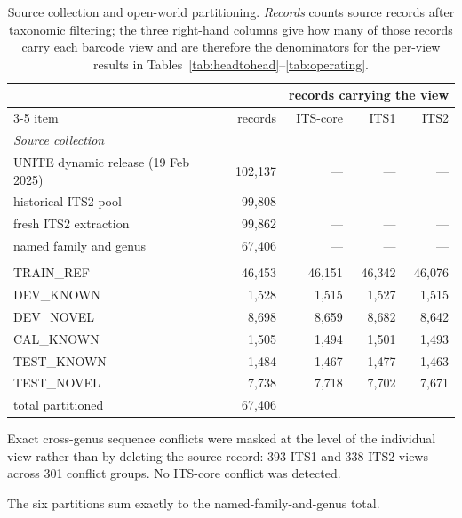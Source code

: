 \begin{table}[htbp]\centering
\begin{threeparttable}
\caption{Source collection and open-world partitioning. \emph{Records} counts source records after taxonomic filtering; the three right-hand columns give how many of those records carry each barcode view and are therefore the denominators for the per-view results in Tables~\ref{tab:headtohead}--\ref{tab:operating}.}
\label{tab:dataset}
\small
\setlength{\tabcolsep}{5pt}
\begin{tabular}{lrrrr}
\toprule
 & & \multicolumn{3}{c}{records carrying the view} \\
\cmidrule(l){3-5}
item & records & ITS-core & ITS1 & ITS2 \\
\midrule
\multicolumn{5}{l}{\emph{Source collection}} \\
\quad UNITE dynamic release (19 Feb 2025) & 102,137 & --- & --- & --- \\
\quad historical ITS2 pool & 99,808 & --- & --- & --- \\
\quad fresh ITS2 extraction & 99,862 & --- & --- & --- \\
\quad named family and genus & 67,406 & --- & --- & --- \\
\addlinespace
\multicolumn{5}{l}{\emph{Open-world partitions}} \\
\quad TRAIN\_REF & 46,453 & 46,151 & 46,342 & 46,076 \\
\quad DEV\_KNOWN & 1,528 & 1,515 & 1,527 & 1,515 \\
\quad DEV\_NOVEL & 8,698 & 8,659 & 8,682 & 8,642 \\
\quad CAL\_KNOWN & 1,505 & 1,494 & 1,501 & 1,493 \\
\quad TEST\_KNOWN & 1,484 & 1,467 & 1,477 & 1,463 \\
\quad TEST\_NOVEL & 7,738 & 7,718 & 7,702 & 7,671 \\
\addlinespace
\quad total partitioned & 67,406 & & & \\
\bottomrule
\end{tabular}
\begin{tablenotes}\footnotesize
\item Exact cross-genus sequence conflicts were masked at the level of the individual view rather than by deleting the source record: 393 ITS1 and 338 ITS2 views across 301 conflict groups. No ITS-core conflict was detected.
\item The six partitions sum exactly to the named-family-and-genus total.
\end{tablenotes}
\end{threeparttable}
\end{table}
